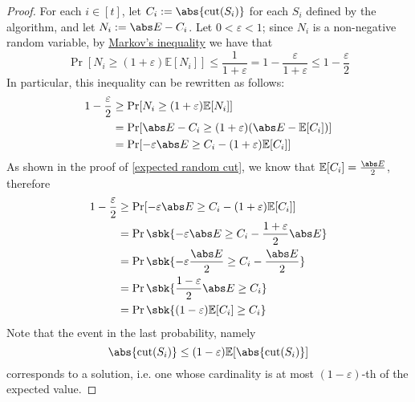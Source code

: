 \documentclass[a4paper, 12pt]{report}
\begin{document}
    \begin{proof}
        For each $i \in [t]$, let $C_i := \abs{\mathrm{cut}(S_i)}$ for each $S_i$ defined by the algorithm, and let $N_i := \abs E - C_i$. Let $0 < \varepsilon < 1$; since $N_i$ is a non-negative random variable, by \href{https://en.wikipedia.org/wiki/Markov%27s_inequality}{Markov's inequality} we have that $$\Pr[N_i \ge (1 + \varepsilon) \mathbb E [N_i]] \le \dfrac{1}{1 + \varepsilon} = 1 - \dfrac{\varepsilon}{1 + \varepsilon} \le 1 - \dfrac{\varepsilon}{2}$$ In particular, this inequality can be rewritten as follows:
        \begin{equation*}
            \begin{split}
                1 - \dfrac{\varepsilon}{2} &\ge \Pr[N_i \ge (1 + \varepsilon) \mathbb E [N_i]] \\
                                           &= \Pr[\abs E - C_i \ge (1 + \varepsilon)(\abs E - \mathbb E [C_i])] \\
                                           &= \Pr[- \varepsilon \abs E \ge C_i - (1 + \varepsilon) \mathbb E [C_i]]
            \end{split}
        \end{equation*}
        As shown in the proof of \cref{expected random cut}, we know that $\mathbb E [C_i] = \frac{\abs E}{2}$, therefore
        \begin{equation*}
            \begin{split}
                1 - \dfrac{\varepsilon}{2} &\ge \Pr[- \varepsilon \abs E \ge C_i - (1 + \varepsilon) \mathbb E [C_i]] \\
                                           &= \Pr \sbk{- \varepsilon \abs E \ge C_i - \dfrac{1 + \varepsilon}{2} \abs E} \\
                                           &= \Pr \sbk{- \varepsilon \dfrac{\abs E}{2} \ge C_i - \dfrac{\abs E}{2}} \\
                                           &= \Pr \sbk{\dfrac{1 - \varepsilon}{2} \abs E\ge C_i} \\
                                           &= \Pr \sbk{(1 - \varepsilon) \mathbb E[C_i] \ge C_i} \\
            \end{split}
        \end{equation*}
        Note that the event in the last probability, namely $$\abs{\mathrm{cut}(S_i)}  \le (1 - \varepsilon) \mathbb E [\abs{\mathrm{cut}(S_i)}]$$ corresponds to a  solution, i.e. one whose cardinality is at most $(1 - \varepsilon)$-th of the expected value.


\end{proof}
\end{document}
